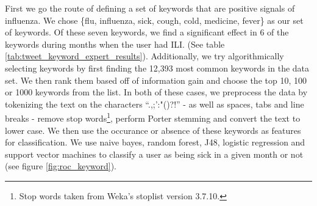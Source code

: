 \documentclass{acm_proc_article-sp}
\begin{document}
First we go the route of defining a set of keywords that are positive signals of influenza. We chose \{flu, influenza, sick, cough, cold, medicine, fever\} as our set of keywords. Of these seven keywords, we find a significant effect in 6 of the keywords during months when the user had ILI. (See table \ref{tab:tweet_keyword_expert_results}). Additionally, we try algorithmically selecting keywords by first finding the 12,393 most common keywords in the data set.  We then rank them based off of information gain and choose the top 10, 100 or 1000 keywords from the list. In both of these cases, we preprocess the data by tokenizing the text on the characters ``.,;':"()?!'' - as well as spaces, tabs and line breaks - remove stop words\footnote{Stop words taken from Weka's stoplist version 3.7.10.}, perform Porter stemming \cite{Porter:1980dd,Willett:2006vb}  and convert the text to lower case. We then use the occurance or absence of these keywords as features for classification. We use naive bayes, random forest, J48, logistic regression and support vector machines to classify a user as being sick in a given month or not (see figure \ref{fig:roc_keyword}).
\end{document}
